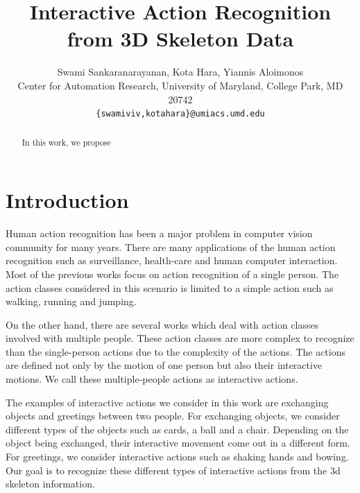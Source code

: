 \documentclass[10pt,twocolumn,letterpaper]{article}
\begin{document}
\title{Interactive Action Recognition from 3D Skeleton Data}

\author{Swami Sankaranarayanan, Kota Hara, Yiannis Aloimonos\\
Center for Automation Research, University of Maryland, College Park, MD 20742\\
{\tt\small \{swamiviv,kotahara\}@umiacs.umd.edu}
}


\maketitle

\begin{abstract}
In this work, we propose
   
\end{abstract}

\section{Introduction}
Human action recognition has been a major problem in computer vision community for many years. There are many applications of the human action recognition such as surveillance, health-care and human computer interaction. Most of the previous works focus on action recognition of a single person. The action classes considered in this scenario is limited to a simple action such as walking, running and jumping. 

On the other hand, there are several works which deal with action classes involved with multiple people. These action classes are more complex to recognize than the single-person actions due to the complexity of the actions. The actions are defined not only by the motion of one person but also their interactive motions. We call these multiple-people actions as interactive actions.

The examples of interactive actions we consider in this work are exchanging objects and greetings between two people. For exchanging objects, we consider different types of the objects such as cards, a ball and a chair. Depending on the object being exchanged, their interactive movement come out in a different form. For greetings, we consider interactive actions such as shaking hands and bowing. Our goal is to recognize these different types of interactive actions from the 3d skeleton information.
\end{document}
